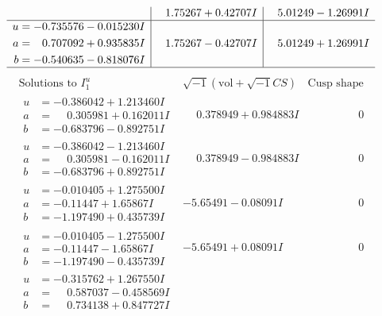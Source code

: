 \documentclass[1p]{elsarticle_modified}
\theoremstyle{definition}
\newcommand{\I}{\sqrt{-1}}
\begin{document}
$$\begin{array}{c|c|c}
 & \phantom{-}1.75267 + 0.42707 I & \phantom{-}5.01249 - 1.26991 I \\ \hline\begin{aligned}
u &= -0.735576 - 0.015230 I \\
a &= \phantom{-}0.707092 + 0.935835 I \\
b &= -0.540635 - 0.818076 I\end{aligned}
 & \phantom{-}1.75267 - 0.42707 I & \phantom{-}5.01249 + 1.26991 I\\
 \hline 
 \end{array}$$\newpage$$\begin{array}{c|c|c}  
\text{Solutions to }I^u_{1}& \I (\text{vol} + \sqrt{-1}CS) & \text{Cusp shape}\\
 \hline 
\begin{aligned}
u &= -0.386042 + 1.213460 I \\
a &= \phantom{-}0.305981 + 0.162011 I \\
b &= -0.683796 - 0.892751 I\end{aligned}
 & \phantom{-}0.378949 + 0.984883 I & \phantom{-0.000000 } 0 \\ \hline\begin{aligned}
u &= -0.386042 - 1.213460 I \\
a &= \phantom{-}0.305981 - 0.162011 I \\
b &= -0.683796 + 0.892751 I\end{aligned}
 & \phantom{-}0.378949 - 0.984883 I & \phantom{-0.000000 } 0 \\ \hline\begin{aligned}
u &= -0.010405 + 1.275500 I \\
a &= -0.11447 + 1.65867 I \\
b &= -1.197490 + 0.435739 I\end{aligned}
 & -5.65491 - 0.08091 I & \phantom{-0.000000 } 0 \\ \hline\begin{aligned}
u &= -0.010405 - 1.275500 I \\
a &= -0.11447 - 1.65867 I \\
b &= -1.197490 - 0.435739 I\end{aligned}
 & -5.65491 + 0.08091 I & \phantom{-0.000000 } 0 \\ \hline\begin{aligned}
u &= -0.315762 + 1.267550 I \\
a &= \phantom{-}0.587037 - 0.458569 I \\
b &= \phantom{-}0.734138 + 0.847727 I\end{aligned}

\end{array}$$
\end{document}
